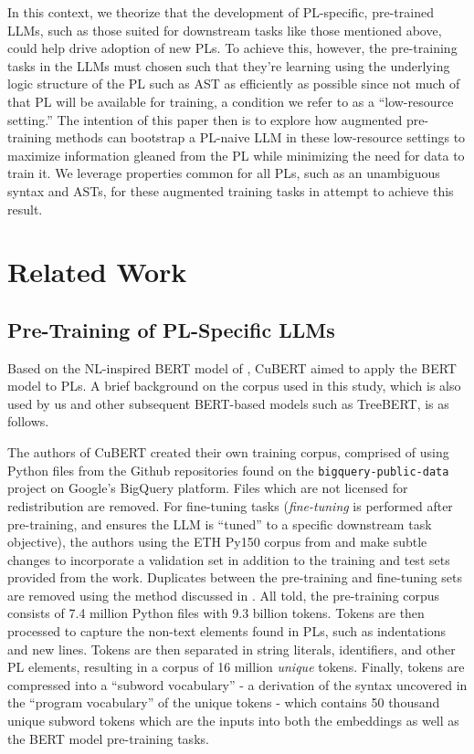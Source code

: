 \documentclass[acmlarge]{acmart}
\begin{document}
In this context, we theorize that the development of PL-specific, pre-trained LLMs, such as those suited for downstream tasks like those mentioned above, could help drive adoption of new PLs. To achieve this, however, the pre-training tasks in the LLMs must chosen such that they're learning using the underlying logic structure of the PL such as AST as efficiently as possible since not much of that PL will be available for training, a condition we refer to as a ``low-resource setting.'' The intention of this paper then is to explore how augmented pre-training methods can bootstrap a PL-naive LLM in these low-resource settings to maximize information gleaned from the PL while minimizing the need for data to train it. We leverage properties common for all PLs, such as an unambiguous syntax and ASTs, for these augmented training tasks in attempt to achieve this result.


\section{Related Work}

\subsection{Pre-Training of PL-Specific LLMs}

Based on the NL-inspired BERT model of \cite{BERT}, CuBERT \cite{CuBERT} aimed to apply the BERT model to PLs. A brief background on the corpus used in this study, which is also used by us and other subsequent BERT-based models such as TreeBERT, is as follows. 

The authors of CuBERT \cite{CuBERT} created their own training corpus, comprised of using Python files from the Github repositories found on the \texttt{bigquery-public-data} project on Google's BigQuery platform. Files which are not licensed for redistribution are removed. For fine-tuning tasks (\textit{fine-tuning} is performed after pre-training, and ensures the LLM is ``tuned'' to a specific downstream task objective), the authors using the ETH Py150 corpus from \cite{py150} and make subtle changes to incorporate a validation set in addition to the training and test sets provided from the work. Duplicates between the pre-training and fine-tuning sets are removed using the method discussed in \cite{dedupe}. All told, the pre-training corpus consists of 7.4 million Python files with 9.3 billion tokens. Tokens are then processed to capture the non-text elements found in PLs, such as indentations and new lines. Tokens are then separated in string literals, identifiers, and other PL elements, resulting in a corpus of 16 million \textit{unique} tokens. Finally, tokens are compressed into a ``subword vocabulary'' \cite[p.3]{CuBERT} - a derivation of the syntax uncovered in the ``program vocabulary'' of the unique tokens - which contains 50 thousand unique subword tokens which are the inputs into both the embeddings as well as the BERT model pre-training tasks.
\end{document}
